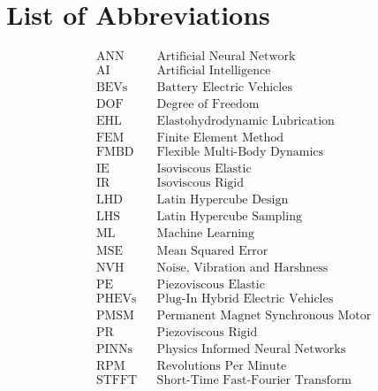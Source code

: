 
\chapter*{List of Abbreviations}
\begin{align*}
	&\text{ANN} &&\text{Artificial Neural Network}\\
	&\text{AI} &&\text{Artificial Intelligence}\\
	&\text{BEVs} &&\text{Battery Electric Vehicles}\\
	&\text{DOF} &&\text{Degree of Freedom}\\
	&\text{EHL} &&\text{Elastohydrodynamic Lubrication}\\
	&\text{FEM} &&\text{Finite Element Method}\\
	&\text{FMBD} &&\text{Flexible Multi-Body Dynamics}\\
	&\text{IE} &&\text{Isoviscous Elastic}\\
	&\text{IR} &&\text{Isoviscous Rigid}\\
	&\text{LHD} &&\text{Latin Hypercube Design}\\
	&\text{LHS} &&\text{Latin Hypercube Sampling}\\
	&\text{ML} &&\text{Machine Learning}\\
	&\text{MSE} &&\text{Mean Squared Error}\\
	&\text{NVH} &&\text{Noise, Vibration and Harshness}\\
	&\text{PE} &&\text{Piezoviscous Elastic}\\
	&\text{PHEVs} &&\text{Plug-In Hybrid Electric Vehicles}\\
	&\text{PMSM} &&\text{Permanent Magnet Synchronous Motor}\\
	&\text{PR} &&\text{Piezoviscous Rigid}\\
	&\text{PINNs} &&\text{Physics Informed Neural Networks}\\
	&\text{RPM} &&\text{Revolutions Per Minute}\\
	&\text{STFFT} &&\text{Short-Time Fast-Fourier Transform}\\
\end{align*}
